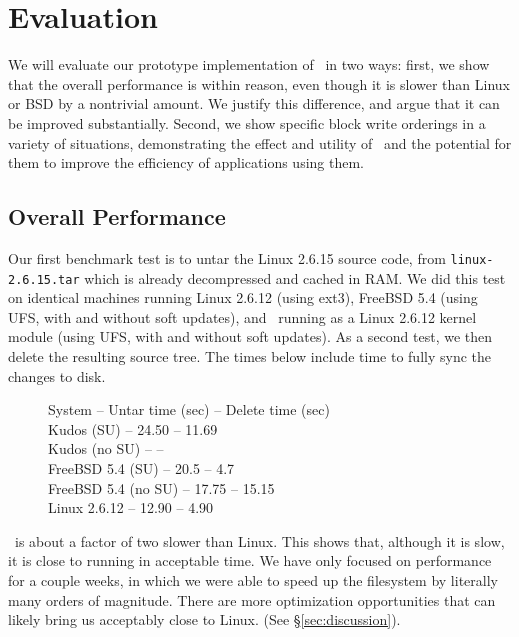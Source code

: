 \section {Evaluation}
\label{sec:evaluation}

We will evaluate our prototype implementation of \Kudos\ in two ways: first, we
show that the overall performance is within reason, even though it is slower
than Linux or BSD by a nontrivial amount. We justify this difference, and argue
that it can be improved substantially. Second, we show specific block write
orderings in a variety of situations, demonstrating the effect and utility of
\opgroups\ and the potential for them to improve the efficiency of applications
using them.

\subsection {Overall Performance}

Our first benchmark test is to untar the Linux 2.6.15 source code, from
\texttt{linux-2.6.15.tar} which is already decompressed and cached in RAM. We
did this test on identical machines running Linux 2.6.12 (using ext3), FreeBSD
5.4 (using UFS, with and without soft updates), and \Kudos\ running as a Linux
2.6.12 kernel module (using UFS, with and without soft updates). As a second
test, we then delete the resulting source tree. The times below include time to
fully sync the changes to disk.

\begin{figure}[htb]
System -- Untar time (sec) -- Delete time (sec) \\
Kudos (SU) -- 24.50 -- 11.69 \\ 
Kudos (no SU) -- -- \\ 
FreeBSD 5.4 (SU) -- 20.5 -- 4.7 \\ 
FreeBSD 5.4 (no SU) -- 17.75 -- 15.15 \\ 
Linux 2.6.12 -- 12.90 -- 4.90 
\end{figure}

\Kudos\ is about a factor of two slower than Linux. This shows that,
although it is slow, it is close to running in acceptable time. We
have only focused on performance for a couple weeks, in which we were
able to speed up the filesystem by literally many orders of
magnitude. There are more optimization opportunities that can likely
bring us acceptably close to Linux. (See \S\ref{sec:discussion}).

